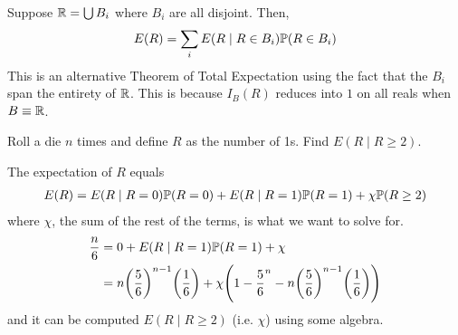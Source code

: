 \begin{aside}
    Suppose $\mathbb{R} = \bigcup B_i$ where $B_i$ are all disjoint. Then,
    \begin{align}
        E(R) = \sum_i E(R \mid R \in B_i) \mathbb{P}(R \in B_i)
    \end{align}
    This is an alternative Theorem of Total Expectation using the fact that the $B_i$ span the entirety of $\mathbb{R}$. This is because $I_B(R)$ reduces into $1$ on all reals when $B \equiv \mathbb{R}$.
\end{aside}

\begin{example}
    Roll a die $n$ times and define $R$ as the number of 1s. Find $E(R \mid R \ge 2)$.
\end{example}
\begin{solution}
    The expectation of $R$ equals
    \begin{align}
        E(R) = E(R \mid R = 0) \mathbb{P}(R = 0) + E(R \mid R = 1) \mathbb{P}(R = 1) + \chi \mathbb{P}(R \ge 2)
    \end{align}
    where $\chi$, the sum of the rest of the terms, is what we want to solve for.
    \begin{align}
        \frac{n}{6} &= 0 + E(R \mid R = 1) \mathbb{P}(R = 1) + \chi\\
        &= n \qty(\frac{5}{6})^{n-1} \qty(\frac{1}{6}) + \chi \qty(1 - \frac{5}{6}^n - n\qty(\frac{5}{6})^{n-1}\qty(\frac{1}{6}))
    \end{align}
    and it can be computed $E(R \mid R \ge 2)$ (i.e. $\chi$) using some algebra.
\end{solution}
